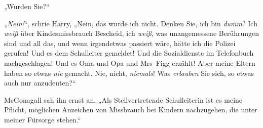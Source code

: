 „Wurden Sie?“

„\emph{Nein!}“, schrie Harry,
„Nein, das wurde ich nicht. Denken Sie, ich bin \emph{dumm}? Ich \emph{weiß} über Kindesmissbrauch Bescheid, ich \emph{weiß}, was unangemessene Berührungen sind und all das, und wenn irgendetwas passiert wäre, hätte ich die Polizei gerufen! Und es dem Schulleiter gemeldet! Und die Sozialdienste im Telefonbuch nachgeschlagen! Und es Oma und Opa und Mrs~Figg erzählt! Aber meine Eltern haben so etwas \emph{nie} gemacht. Nie, nicht, \emph{niemals}! Was \emph{erlauben} Sie sich, so etwas auch nur anzudeuten?“

McGonagall sah ihn ernst an.
„Als Stellvertretende Schulleiterin ist es meine Pflicht, möglichen Anzeichen von Missbrauch bei Kindern nachzugehen, die unter meiner Fürsorge stehen.“

